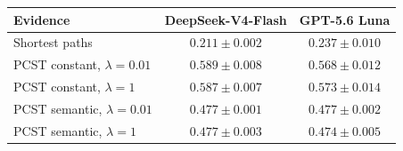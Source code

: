 \begingroup
\small
\begin{tabular}{@{}lcc@{}}
\toprule
Evidence & DeepSeek-V4-Flash & GPT-5.6 Luna \\
\midrule
Shortest paths & $0.211\pm0.002$ & $0.237\pm0.010$ \\
PCST constant, $\lambda=0.01$ & $0.589\pm0.008$ & $0.568\pm0.012$ \\
PCST constant, $\lambda=1$ & $0.587\pm0.007$ & $0.573\pm0.014$ \\
PCST semantic, $\lambda=0.01$ & $0.477\pm0.001$ & $0.477\pm0.002$ \\
PCST semantic, $\lambda=1$ & $0.477\pm0.003$ & $0.474\pm0.005$ \\
\bottomrule
\end{tabular}
\endgroup
